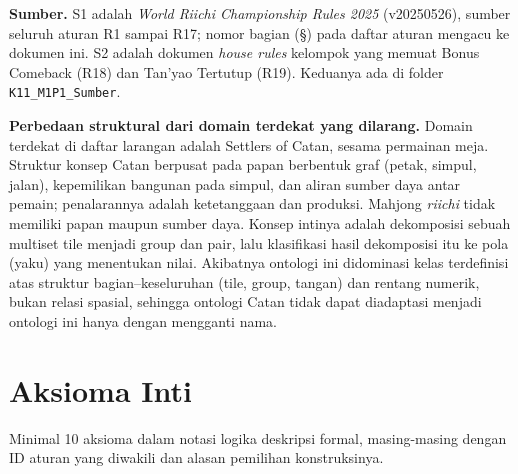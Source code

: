 \documentclass[11pt,a4paper]{article}
\begin{document}
\textbf{Sumber.} S1 adalah \emph{World Riichi Championship Rules 2025} (v20250526), sumber
seluruh aturan R1 sampai R17; nomor bagian (§) pada daftar aturan mengacu ke dokumen
ini. S2 adalah dokumen \emph{house rules} kelompok yang memuat Bonus Comeback (R18) dan
Tan'yao Tertutup (R19). Keduanya ada di folder \texttt{K11\_M1P1\_Sumber}.

\textbf{Perbedaan struktural dari domain terdekat yang dilarang.} Domain terdekat di
daftar larangan adalah Settlers of Catan, sesama permainan meja. Struktur konsep Catan
berpusat pada papan berbentuk graf (petak, simpul, jalan), kepemilikan bangunan pada
simpul, dan aliran sumber daya antar pemain; penalarannya adalah ketetanggaan dan
produksi. Mahjong \emph{riichi} tidak memiliki papan maupun sumber daya. Konsep
intinya adalah dekomposisi sebuah multiset tile menjadi group dan pair, lalu
klasifikasi hasil dekomposisi itu ke pola (yaku) yang menentukan nilai. Akibatnya
ontologi ini didominasi kelas terdefinisi atas struktur bagian--keseluruhan
(tile, group, tangan) dan rentang numerik, bukan relasi spasial, sehingga ontologi
Catan tidak dapat diadaptasi menjadi ontologi ini hanya dengan mengganti nama.

\section{Aksioma Inti}

Minimal 10 aksioma dalam notasi logika deskripsi formal, masing-masing dengan
ID aturan yang diwakili dan alasan pemilihan konstruksinya.
\end{document}
